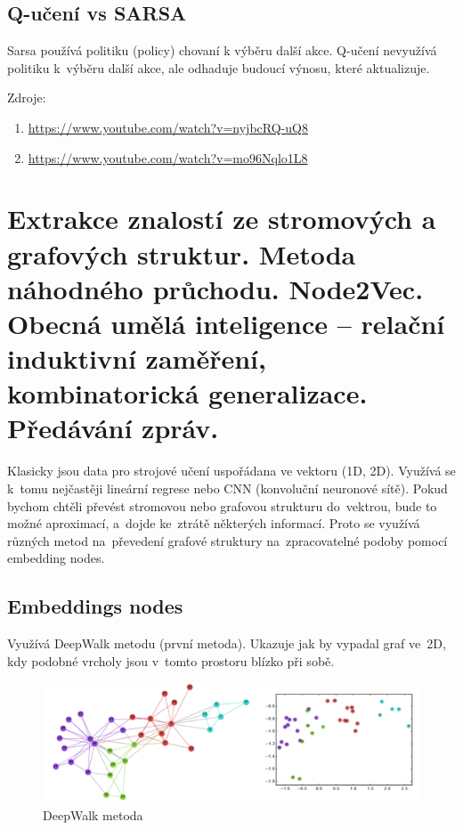 \subsection{Q-učení vs SARSA}

Sarsa používá politiku (policy) chovaní k výběru další akce.
Q-učení nevyužívá politiku k~výběru další akce, ale odhaduje budoucí výnosu, které aktualizuje.

Zdroje:
\begin{enumerate}
    \item \url{https://www.youtube.com/watch?v=nyjbcRQ-uQ8}
    \item \url{https://www.youtube.com/watch?v=mo96Nqlo1L8}
\end{enumerate}

\clearpage
\section{Extrakce znalostí ze stromových a grafových struktur. Metoda náhodného průchodu. Node2Vec. Obecná umělá inteligence – relační induktivní zaměření, kombinatorická generalizace. Předávání zpráv.}

Klasicky jsou data pro strojové učení uspořádana ve vektoru (1D, 2D). 
Využívá se k~tomu nejčastěji lineární regrese nebo CNN (konvoluční neuronové sítě). 
Pokud bychom chtěli převést stromovou nebo grafovou strukturu do~vektrou, bude to možné aproximací, a~dojde ke~ztrátě některých informací.
Proto se využívá různých metod na~převedení grafové struktury na~zpracovatelné podoby pomocí embedding nodes.

\subsection{Embeddings nodes}

Využívá DeepWalk metodu (první metoda). 
Ukazuje jak by vypadal graf ve~2D, kdy podobné vrcholy jsou v~tomto prostoru blízko při sobě.

\begin{figure}[ht]
    \centering
    \includegraphics[width=\textwidth]{images/11_deepwalk-graf}
    \caption{DeepWalk metoda}
\end{figure}

